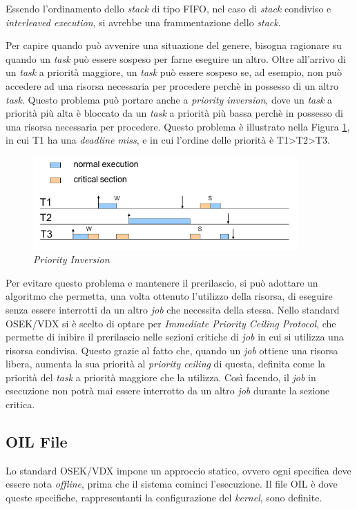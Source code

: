\documentclass{article}
\begin{document}
Essendo l'ordinamento dello \textit{stack} di tipo FIFO, nel caso di \textit{stack} condiviso e \textit{interleaved execution}, si avrebbe una frammentazione dello \textit{stack}.

Per capire quando può avvenire una situazione del genere, bisogna ragionare su quando un \textit{task} può essere sospeso per farne eseguire un altro. Oltre all'arrivo di un \textit{task} a priorità maggiore, un \textit{task} può essere sospeso se, ad esempio, non può accedere ad una risorsa necessaria per procedere perchè in possesso di un altro \textit{task}. Questo problema può portare anche a \textit{priority inversion}, dove un \textit{task} a priorità più alta è bloccato da un \textit{task} a priorità più bassa perchè in possesso di una risorsa necessaria per procedere. Questo problema è illustrato nella Figura \ref{priority-inversion}, in cui T1 ha una \textit{deadline miss}, e in cui l'ordine delle priorità è T1>T2>T3.

\begin{figure}[H]
	\centering
	\includegraphics[width=4in]{image/Priority_inversion.png}
	\caption{\textit{\textit{Priority Inversion}}}
	\label{priority-inversion}
\end{figure}

Per evitare questo problema e mantenere il prerilascio, si può adottare un algoritmo che permetta, una volta ottenuto l'utilizzo della risorsa, di eseguire senza essere interrotti da un altro \textit{job} che necessita della stessa. Nello standard OSEK/VDX si è scelto di optare per \textit{Immediate Priority Ceiling Protocol}, che permette di inibire il prerilascio nelle sezioni critiche di \textit{job} in cui si utilizza una risorsa condivisa. Questo grazie al fatto che, quando un \textit{job} ottiene una risorsa libera, aumenta la sua priorità al \textit{priority ceiling} di questa, definita come la priorità del \textit{task} a priorità maggiore che la utilizza. Così facendo, il \textit{job} in esecuzione non potrà mai essere interrotto da un altro \textit{job} durante la sezione critica.

\subsection{OIL File}
Lo standard OSEK/VDX impone un approccio statico, ovvero ogni specifica deve essere nota \textit{offline}, prima che il sistema cominci l'esecuzione. Il file OIL è dove queste specifiche, rappresentanti la configurazione del \textit{kernel}, sono definite.
\end{document}

